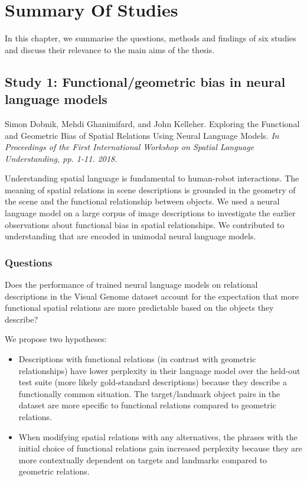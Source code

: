 \chapter{Summary Of Studies}
\label{sec:related}



In this chapter, we summarise the questions, methods and findings of six studies and discuss their relevance to the main aims of the thesis.

\section{Study 1: Functional/geometric bias in neural language models}
\label{study:fungeo}
Simon Dobnik, Mehdi Ghanimifard, and John Kelleher. 
Exploring the Functional and Geometric Bias of Spatial Relations Using Neural Language Models.
\textit{In Proceedings of the First International Workshop on Spatial Language Understanding, pp. 1-11. 2018.}

Understanding spatial language is fundamental to human-robot interactions. 
The meaning of spatial relations in scene descriptions is grounded in the geometry of the scene and the functional relationship between objects. 
We used a neural language model on a large corpus of image descriptions to investigate the earlier observations about functional bias in spatial relationships.
We contributed to understanding that are encoded in unimodal neural language models.

\subsection{Questions}

Does the performance of trained neural language models on relational descriptions in the Visual Genome dataset  \citep{krishna2017visual} account for the expectation that more functional spatial relations are more predictable based on the objects they describe? 

We propose two hypotheses: 
\begin{itemize}
	\item Descriptions with functional relations (in contrast with geometric relationships) have lower perplexity in their language model over the held-out test suite (more likely gold-standard descriptions) because they describe a functionally common situation. The target/landmark object pairs in the dataset are more specific to functional relations compared to geometric relations. 
	\item When modifying spatial relations with any alternatives, the phrases with the initial choice of functional relations gain increased perplexity because they are more contextually dependent on targets and landmarks compared to geometric relations.
\end{itemize}



